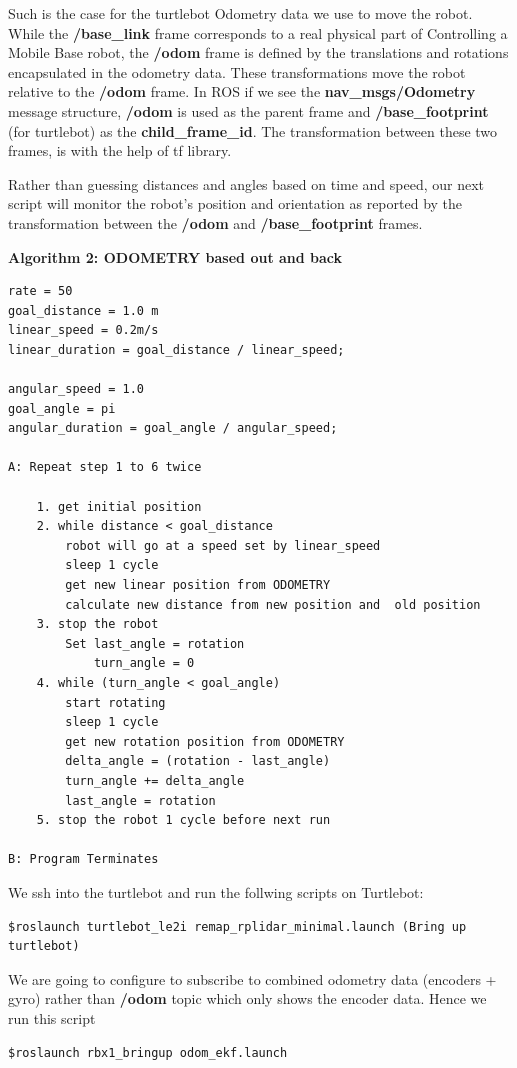 \documentclass[10pt,a4paper]{article}
\begin{document}
Such is the case for the turtlebot Odometry data we use to move the robot.
While the \textbf{/base\_link} frame corresponds to a real physical part of Controlling a Mobile Base robot, the \textbf{/odom} frame is defined by the translations and rotations encapsulated in the odometry data. These transformations move the robot relative to the \textbf{/odom} frame.
In ROS if we see the \textbf{nav\_msgs/Odometry} message structure, \textbf{/odom }is used as the parent frame and \textbf{/base\_footprint} (for turtlebot) as the \textbf{child\_frame\_id}. The transformation between these two frames, is with the help of tf library.

Rather than guessing distances and angles based on time and speed, our next script will monitor the robot's position and orientation as reported by the transformation between the \textbf{/odom }and \textbf{/base\_footprint} frames.


\textbf{Algorithm 2: ODOMETRY based out and back}
\begin{lstlisting}[frame=single]
rate = 50
goal_distance = 1.0 m
linear_speed = 0.2m/s
linear_duration = goal_distance / linear_speed;

angular_speed = 1.0
goal_angle = pi
angular_duration = goal_angle / angular_speed;

A: Repeat step 1 to 6 twice

	1. get initial position
	2. while distance < goal_distance
		robot will go at a speed set by linear_speed
		sleep 1 cycle
		get new linear position from ODOMETRY
		calculate new distance from new position and  old position
	3. stop the robot
		Set last_angle = rotation
			turn_angle = 0
	4. while (turn_angle < goal_angle)
		start rotating
		sleep 1 cycle
		get new rotation position from ODOMETRY
		delta_angle = (rotation - last_angle)
		turn_angle += delta_angle
		last_angle = rotation	
	5. stop the robot 1 cycle before next run
	
B: Program Terminates
\end{lstlisting}


We ssh into the turtlebot and run the follwing scripts
on Turtlebot:
\begin{lstlisting}[frame=single] 
$roslaunch turtlebot_le2i remap_rplidar_minimal.launch (Bring up turtlebot)
\end{lstlisting}
We are going to configure to subscribe to combined odometry data (encoders + gyro) 
rather than \textbf{/odom }topic which only shows the encoder data. Hence we run this script
\begin{lstlisting}[frame=single] 
$roslaunch rbx1_bringup odom_ekf.launch
\end{lstlisting}
\end{document}
